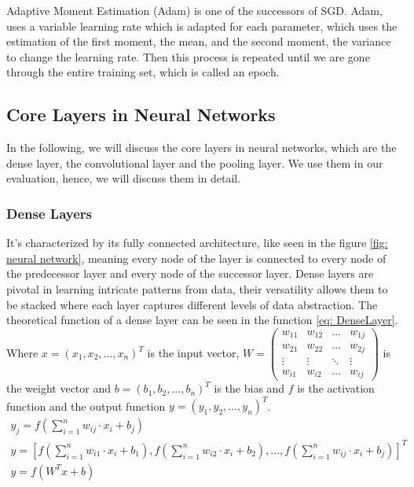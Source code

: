 Adaptive Moment Estimation (Adam) \cite{kingma_adam_2017} is one of the successors of SGD. Adam, uses a variable learning rate which is adapted for each parameter, which uses the estimation of the first moment, the mean, and the second moment, the variance to change the learning rate.
Then this process is repeated until we are gone through the entire training set, which is called an epoch.

\subsection*{Core Layers in Neural Networks}\label{subsec:core-layers-in-neural-networks}
In the following, we will discuss the core layers in neural networks, which are the dense layer, the convolutional layer and the pooling layer.
We use them in our evaluation, hence, we will discuss them in detail.
\subsubsection{Dense Layers}
It's characterized by its fully connected architecture, like seen in the figure \ref{fig: neural network}, meaning every node of the layer is connected to every node of the predecessor layer and every node of the successor layer.
Dense layers are pivotal in learning intricate patterns from data, their versatility allows them to be stacked where each layer captures different levels of data abstraction.
The theoretical function of a dense layer can be seen in the function \ref{eq: DenseLayer}.
Where $x = (x_1,x_2,\dots,x_n)^T$ is the input vector,
$W = \left(\begin{smallmatrix}w_{11} & w_{12} & \dots & w_{1j}\\w_{21} & w_{22} & \dots & w_{2j}\\\vdots & \vdots & \ddots & \vdots\\w_{i1} & w_{i2} & \dots & w_{ij}\end{smallmatrix}\right)$
is the weight vector and $b = (b_1,b_2,\dots,b_n)^T$ is the bias and $f$ is the activation function and the output function $y = (y_1,y_2,\dots,y_n)^T$.
\begin{gather}
    y_j = f\left( \sum^n_{i=1} w_{ij}\cdot x_i + b_j\right)\\
    y = \left[ f\left( \sum^n_{i=1} w_{i1} \cdot x_i + b_1\right),f\left( \sum^n_{i=1} w_{i2} \cdot x_i + b_2\right),\dots,f\left( \sum^n_{i=1} w_{ij} \cdot x_i + b_j\right) \right]^T\\
    y = f(W^T x+b)
    \label{eq: DenseLayer}
\end{gather}

